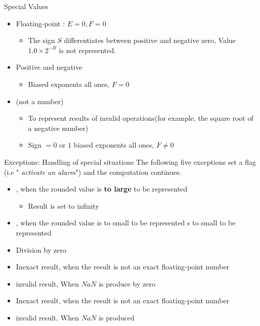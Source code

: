        \begin{parag}{Special Values}
            \begin{itemize}
                \item Floating-point : $E = 0, F = 0$
                    \begin{itemize}
                        \item The sign $S$ differentiates between positive and negative zero, Value $1.0 \times 2^{-B}$ is not represented.
                    \end{itemize}
                \item Positive and negative 
                    \begin{itemize}
                        \item Biased exponents all ones, $F = 0$
                       
                    \end{itemize}
                \item {} (not a number)
                    \begin{itemize}
                        \item To represent results of invalid operations(for example, the square root of a negative number)
                        \item Sign $= 0$ or $1$ biased exponents all ones, $F \neq 0$
                    \end{itemize}
            \end{itemize}
        \end{parag}
        
        \begin{parag}{Exceptions: Handling of special situations}
            The following five exceptions set a flag (i.e " \textit{activate an alarm}") and the computation continues.
            \begin{itemize}
                \item {}, when the rounded value is \textbf{to large} to be represented 
                    \begin{itemize}
                        \item Result is set to infinity
                    \end{itemize}
                \item {}, when the rounded value is to small to be represented
            s to small to be represented
        \item Division by zero
        \item Inexact result, when the result is not an exact floating-point number
        \item invalid result, When $NaN$ is produce by zero
                \item Inexact result, when the result is not an exact floating-point number
                \item invalid result, When $NaN$ is produced
            \end{itemize}
        
        \end{parag}
        
